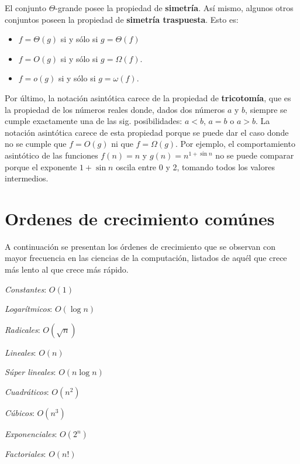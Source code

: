 El conjunto $\Theta$-grande posee la propiedad de \textbf{simetría}.
Así mismo, algunos otros conjuntos poseen la propiedad de \textbf{simetría traspuesta}.
Esto es:
\begin{itemize}
  \item \(f=\Theta(g)\) si y sólo si \(g=\Theta(f)\)
  \item \(f=O(g)\) si y sólo si \(g=\Omega(f)\).
  \item \(f=o(g)\) si y sólo si \(g=\omega(f)\).
\end{itemize}

Por último, la notación asintótica carece de la propiedad de \textbf{tricotomía}, que es la propiedad de los números reales donde, dados dos números $a$ y $b$, siempre se cumple exactamente una de las sig. posibilidades: $a<b$, $a=b$ o $a>b$. 
La notación asintótica carece de esta propiedad porque se puede dar el caso donde no se cumple que \(f=O(g)\) ni que \(f=\Omega(g)\).
Por ejemplo, el comportamiento asintótico de las funciones \(f(n)=n\) y \(g(n)=n^{1+\sin{n}}\) no se puede comparar porque el exponente $1+\sin{n}$ oscila entre 0 y 2, tomando todos los valores intermedios.

\section{Ordenes de crecimiento comúnes}

A continuación se presentan los órdenes de crecimiento que se observan con mayor frecuencia en las ciencias de la computación, listados de aquél que crece más lento al que crece más rápido.

\begin{enumerate}
  \begin{multicols}{2}
    \item \emph{Constantes}: \(O(1)\)
    \item \emph{Logarítmicos}: \(O(\log n)\)
    \item \emph{Radicales}: \(O(\sqrt{n})\)
    \item \emph{Lineales}: \(O(n)\)
    \item \emph{Súper lineales}: \(O(n\log n)\)
    \item \emph{Cuadráticos}: \(O(n^{2})\)
    \item \emph{Cúbicos}: \(O(n^{3})\)
    \item \emph{Exponenciales}: \(O(2^{n})\)
    \item \emph{Factoriales}: \(O(n!)\)
  \end{multicols}
\end{enumerate}

